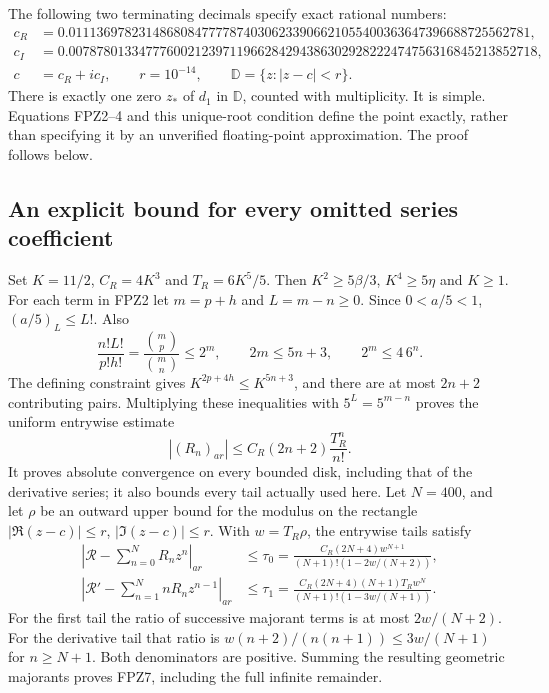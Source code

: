 The following two terminating decimals specify exact rational numbers:
\[
 \begin{split}
 c_R&=0.011136978231486808477778740306233906621055400363647396688725562781,\\
 c_I&=0.0078780133477760021239711966284294386302928222474756316845213852718,\\
 c&=c_R+ic_I,\qquad r=10^{-14},\qquad
 \mathbb D=\{z:|z-c|<r\}.
 \end{split}\tag{FPZ4}
\]
There is exactly one zero $z_*$ of $d_1$ in $\mathbb D$, counted with
multiplicity. It is simple. Equations FPZ2--4 and this unique-root
condition define the point exactly, rather than specifying it by an
unverified floating-point approximation. The proof follows below.

\subsection{An explicit bound for every omitted series coefficient}
Set $K=11/2$, $C_R=4K^3$ and $T_R=6K^5/5$. Then
$K^2\ge5\beta/3$, $K^4\ge5\eta$ and $K\ge1$. For each term in
FPZ2 let $m=p+h$ and $L=m-n\ge0$. Since $0<a/5<1$,
$(a/5)_L\le L!$. Also
\[
 \frac{n!L!}{p!h!}=\frac{\binom mp}{\binom mn}\le2^m,
 \qquad 2m\le5n+3,\qquad 2^m\le4\,6^n.
 \tag{FPZ5}
\]
The defining constraint gives $K^{2p+4h}\le K^{5n+3}$, and there
are at most $2n+2$ contributing pairs. Multiplying these inequalities
with $5^L=5^{m-n}$ proves the uniform entrywise estimate
\[
 |(R_n)_{ar}|\le C_R(2n+2)\frac{T_R^n}{n!}.
 \tag{FPZ6}
\]
It proves absolute convergence on every bounded disk, including that
of the derivative series; it also bounds every tail actually used here.
Let $N=400$, and let $\rho$ be an outward upper bound for the modulus
on the rectangle $|\Re(z-c)|\le r$, $|\Im(z-c)|\le r$.
With $w=T_R\rho$, the entrywise tails satisfy
\[
 \begin{split}
 \left|\mathcal R-\sum_{n=0}^N R_nz^n\right|_{ar}
 &\le\tau_0=
 \frac{C_R(2N+4)w^{N+1}}{(N+1)!(1-2w/(N+2))},\\
 \left|\mathcal R'-\sum_{n=1}^N nR_nz^{n-1}\right|_{ar}
 &\le\tau_1=
 \frac{C_R(2N+4)(N+1)T_Rw^N}
 {(N+1)!(1-3w/(N+1))}.
 \end{split}\tag{FPZ7}
\]
For the first tail the ratio of successive majorant terms is at most
$2w/(N+2)$. For the derivative tail that ratio is
$w(n+2)/(n(n+1))\le3w/(N+1)$ for $n\ge N+1$.
Both denominators are positive. Summing the resulting geometric
majorants proves FPZ7, including the full infinite remainder.

